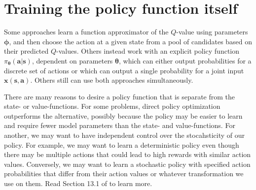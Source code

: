 \documentclass{article}
\begin{document}
\section{Training the policy function itself}

Some approaches learn a function approximator of the $Q$-value using parameters $\boldsymbol{\phi}$, and then choose the action at a given state from a pool of candidates based on their predicted $Q$-values. Others instead work with an explicit policy function $\pi_{\boldsymbol{\theta}}(\mathbf{a}|\mathbf{s})$, dependent on parameters $\boldsymbol{\theta}$, which can either output probabilities for a discrete set of actions or which can output a single probability for a joint input $\mathbf{x}(\mathbf{s}, \mathbf{a})$. Others still can use both approaches simultaneously.

There are many reasons to desire a policy function that is separate from the state- or value-functions. For some problems, direct policy optimization outperforms the alternative, possibly because the policy may be easier to learn and require fewer model parameters than the state- and value-functions. For another, we may want to have independent control over the stocahsticity of our policy. For example, we may want to learn a deterministic policy even though there may be multiple actions that could lead to high rewards with similar action values. Conversely, we may want to learn a stochastic policy with specified action probabilities that differ from their action values or whatever transformation we use on them.  Read Section 13.1 of \cite{sutton_barto_rl} to learn more.
\end{document}
